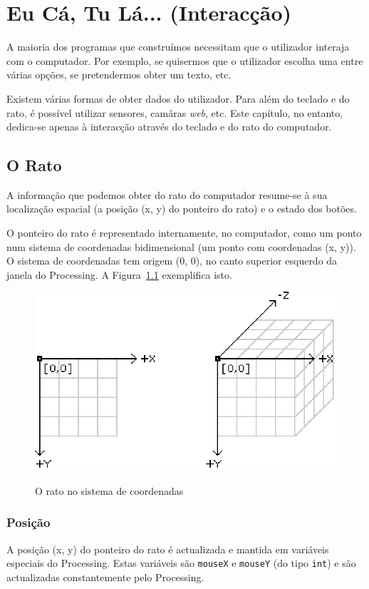\chapter{Eu Cá, Tu Lá... (Interacção)} \label{cap:interaccao}
A maioria dos programas que construímos necessitam que o utilizador
interaja com o computador. Por exemplo, se quisermos que o utilizador escolha uma entre várias opções, se pretendermos obter um texto, etc.

Existem várias formas de obter dados do utilizador. Para além do teclado e do rato, é possível utilizar sensores, camâras \emph{web}, etc. Este capítulo, no entanto, dedica-se apenas à interacção através do teclado e do rato do computador.

\section{O Rato} 
A informação que podemos obter do rato do computador resume-se à sua localização espacial (a posição (x, y) do ponteiro do rato) e o estado dos botões.

O ponteiro do rato é representado internamente, no computador, como um ponto num sistema de coordenadas bidimensional (um ponto com coordenadas (x, y)). O sistema de coordenadas tem origem (0, 0), no canto superior esquerdo da janela do Processing. A Figura~\ref{fig:coordinatesrato} exemplifica isto.
\begin{figure}
	\centering
		\includegraphics{images/coordinates.eps}
	\label{fig:coordinatesrato}
	\caption{O rato no sistema de coordenadas}
\end{figure}

\subsection{Posição}
A posição (x, y) do ponteiro do rato é actualizada e mantida em variáveis especiais do Processing. Estas variáveis são \texttt{mouseX} e \texttt{mouseY} (do tipo \texttt{int}) e são actualizadas constantemente pelo Processing. 

